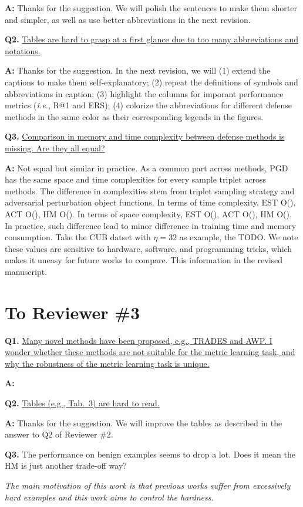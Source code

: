 \documentclass[10pt,twocolumn,letterpaper]{article}
\begin{document}
\noindent\textbf{A:} Thanks for the suggestion. We will polish the sentences to make
them shorter and simpler, as well as use better abbreviations in the next
revision.

\noindent\textbf{Q2.}
%
\ul{
Tables are hard to grasp at a first glance due to too many abbreviations and
notations.
}

\noindent\textbf{A:} Thanks for the suggestion.
In the next revision, we will (1) extend the captions to make them
self-explanatory; (2) repeat the definitions of symbols and abbreviations in
caption; (3) highlight the columns for imporant performance metrics
(\emph{i.e.}, R@1 and ERS); (4) colorize the abbreviations for different
defense methods in the same color as their corresponding legends in the figures. 

\noindent\textbf{Q3.}
%
\ul{
Comparison in memory and time complexity between defense methods is missing. Are they all
equal?
}

\noindent\textbf{A:}
%
Not equal but similar in practice.
%
As a common part across methods, PGD has the same
space and time complexities for every sample triplet across methods.
%
The difference in complexities stem from triplet sampling strategy and
adversarial perturbation object functions.
%
In terms of time complexity, EST O(), ACT O(), HM O().
In terms of space complexity, EST O(), ACT O(), HM O().
%
In practice, such difference lead to minor difference in training time
and memory consumption.
%
Take the CUB datset with
$\eta=32$ as example, the TODO.
%
We note these values are sensitive to hardware, software, and
programming tricks, which makes it uneasy for future works to compare.
%
This information in the revised manuscript.

\section*{To Reviewer \#3}

\noindent\textbf{Q1.}
%
\ul{
Many novel methods have been proposed, e.g., TRADES and AWP.
I wonder whether these methods are not suitable for the metric learning task, and why the robustness of the metric learning task is unique.
}

\noindent\textbf{A:}

\begin{comment}
\noindent\textbf{Q2.} \ul{Does simple tricks for adjusting the hardness.}
\end{comment}

\noindent\textbf{Q2.}
%
\ul{Tables (e.g., Tab.~3) are hard to read.}

\noindent\textbf{A:} Thanks for the suggestion. We will improve the tables as described in the answer to Q2 of Reviewer \#2.

\noindent\textbf{Q3.}
%
The performance on benign examples seems to drop a lot. Does it mean the HM is just another trade-off way?

\emph{The main motivation of this work is that previous works suffer from excessively hard examples and this work aims to control the hardness.}

{\small


}
\end{document}
